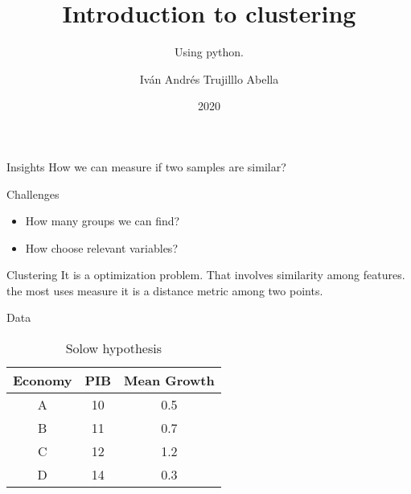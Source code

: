 \documentclass{beamer}
\institute{Javeriana}
\date{2020}
\title[Aicoll] %
{Introduction to clustering}
\subtitle{Using python.}
\author[Iván Andrés Trujillo] 
{
Iván Andrés Trujilllo Abella}
\institute[] 
{
\textbf{Aicoll}
 \\
  \and
  
\textbf{ Unidad de analítica \\
}
}
\date[Analítica] %
\begin{document}
\frame{\titlepage}

\begin{frame}{Insights}
How we can measure if two samples are similar?
\end{frame}


\begin{frame}{Challenges}
\begin{itemize}
\item How many groups we can find?
\item How choose relevant variables?
\end{itemize}

\end{frame}

\begin{frame}{Clustering} 
It is a optimization problem.
That involves similarity among features.
the most uses measure it is a distance metric among two points.
\end{frame}


\begin{frame}{Data}
\begin{table}[]
\begin{tabular}{ccc}
\textbf{Economy} & \textbf{PIB} & \textbf{Mean Growth} \\ \hline
A                & 10           & 0.5                  \\
B                & 11           & 0.7                  \\
C                & 12           & 1.2                  \\
D                & 14           & 0.3                 
\end{tabular}
\caption{Solow hypothesis}
\end{table}
\end{frame}
\end{document}
